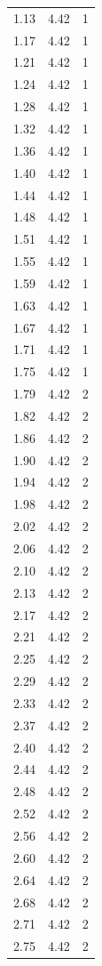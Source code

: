 \begin{longtable}{lrr}
  1.13 & 4.42 & 1 \\
  1.17 & 4.42 & 1 \\
  1.21 & 4.42 & 1 \\
  1.24 & 4.42 & 1 \\
  1.28 & 4.42 & 1 \\
  1.32 & 4.42 & 1 \\
  1.36 & 4.42 & 1 \\
  1.40 & 4.42 & 1 \\
  1.44 & 4.42 & 1 \\
  1.48 & 4.42 & 1 \\
  1.51 & 4.42 & 1 \\
  1.55 & 4.42 & 1 \\
  1.59 & 4.42 & 1 \\
  1.63 & 4.42 & 1 \\
  1.67 & 4.42 & 1 \\
  1.71 & 4.42 & 1 \\
  1.75 & 4.42 & 1 \\
  1.79 & 4.42 & 2 \\
  1.82 & 4.42 & 2 \\
  1.86 & 4.42 & 2 \\
  1.90 & 4.42 & 2 \\
  1.94 & 4.42 & 2 \\
  1.98 & 4.42 & 2 \\
  2.02 & 4.42 & 2 \\
  2.06 & 4.42 & 2 \\
  2.10 & 4.42 & 2 \\
  2.13 & 4.42 & 2 \\
  2.17 & 4.42 & 2 \\
  2.21 & 4.42 & 2 \\
  2.25 & 4.42 & 2 \\
  2.29 & 4.42 & 2 \\
  2.33 & 4.42 & 2 \\
  2.37 & 4.42 & 2 \\
  2.40 & 4.42 & 2 \\
  2.44 & 4.42 & 2 \\
  2.48 & 4.42 & 2 \\
  2.52 & 4.42 & 2 \\
  2.56 & 4.42 & 2 \\
  2.60 & 4.42 & 2 \\
  2.64 & 4.42 & 2 \\
  2.68 & 4.42 & 2 \\
  2.71 & 4.42 & 2 \\
  2.75 & 4.42 & 2 \\

\end{longtable}
